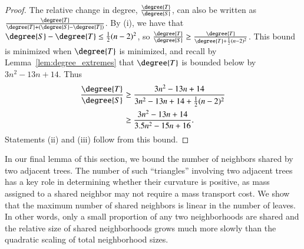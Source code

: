 \documentclass[]{elsarticle}
\begin{document}
\begin{proof}
The relative change in degree, $\frac{\degree{T}}{\degree{S}}$, can also be written as $\frac{\degree{T}}{\degree{T} + (\degree{S} - \degree{T})}$.
By (i), we have that $\degree{S} - \degree{T} \le \frac{1}{2} (n-2)^2$,
so $\frac{\degree{T}}{\degree{S}} \ge \frac{\degree{T}}{\degree{T} + \frac{1}{2} (n-2)^2} $.
This bound is minimized when $\degree{T}$ is minimized, and recall by Lemma~\ref{lem:degree_extremes} that $\degree{T}$ is bounded below by $3n^2 - 13n + 14$.
	Thus
	\begin{align*}
		\frac{\degree{T}}{\degree{S}} &\ge \frac{3n^2 - 13n + 14}{3n^2 - 13n + 14 + \frac{1}{2}(n-2)^2} \\
		&\ge \frac{3n^2 - 13n + 14}{3.5n^2 - 15n + 16}.
	\end{align*}
	Statements (ii) and (iii) follow from this bound.

\end{proof}


In our final lemma of this section, we bound the number of neighbors shared by two adjacent trees.
The number of such ``triangles'' involving two adjacent trees has a key role in determining whether their curvature is positive, as mass assigned to a shared neighbor may not require a mass transport cost.
We show that the maximum number of shared neighbors is linear in the number of leaves.
In other words, only a small proportion of any two neighborhoods are shared and the relative size of shared neighborhoods grows much more slowly than the quadratic scaling of total neighborhood sizes.
\end{document}
